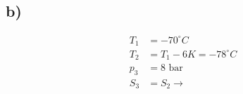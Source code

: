 

\subsection*{b)}
\begin{align*}
    T_1 &= -70^\circ C \\
    T_2 &= T_1 - 6K = -78^\circ C \\
    p_3 &= 8 \text{ bar} \\
    S_3 &= S_2 \rightarrow
\end{align*}